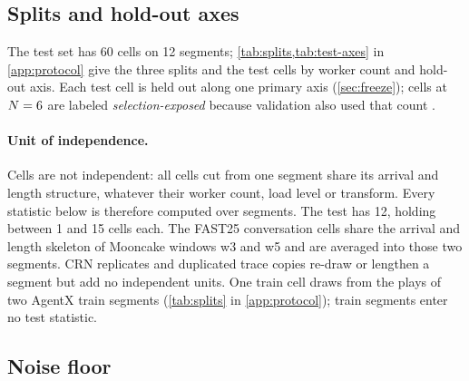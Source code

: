 \subsection{Splits and hold-out axes}
\label{sec:splits}

The test set has 60 cells on 12 segments; \cref{tab:splits,tab:test-axes} in \cref{app:protocol}
give the three splits and the test cells by worker count and hold-out axis. Each test cell is held
out along one primary axis (\cref{sec:freeze}); cells at $N = 6$ are labeled
\emph{selection-exposed} because validation also used that count \citep{cawley2010overfitting}.

\paragraph{Unit of independence.}
Cells are not independent: all cells cut from one segment share its arrival and length structure,
whatever their worker count, load level or transform. Every statistic below is therefore computed
over segments. The test has 12, holding between 1 and 15 cells each. The FAST25 conversation cells
share the arrival and length skeleton of Mooncake windows w3 and w5 and are averaged into those two
segments. CRN replicates and duplicated trace copies re-draw or lengthen a segment but add no
independent units. One train cell draws from the plays of two AgentX train segments
(\cref{tab:splits} in \cref{app:protocol}); train segments enter no test statistic.

\subsection{Noise floor}
\label{sec:noise-floor}

